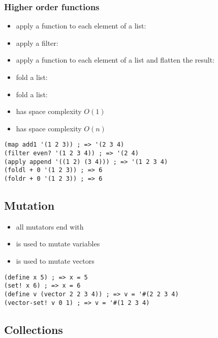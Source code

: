 \documentclass[a4paper,landscape,10pt]{article}
\begin{document}
\begin{multicols*}{2}
  \subsubsection{Higher order functions}

  \begin{itemize}
    \item apply a function to each element of a list: 
    \item apply a filter: 
    \item apply a function to each element of a list and flatten the result: 
    \item fold a list: 
    \item fold a list: 
    \item {} has space complexity \(O(1)\)
    \item {} has space complexity \(O(n)\)
  \end{itemize}

  \begin{lstlisting}[language=Racket]
(map add1 '(1 2 3)) ; => '(2 3 4)
(filter even? '(1 2 3 4)) ; => '(2 4)
(apply append '((1 2) (3 4))) ; => '(1 2 3 4)
(foldl + 0 '(1 2 3)) ; => 6
(foldr + 0 '(1 2 3)) ; => 6
\end{lstlisting}

  \subsection{Mutation}

  \begin{itemize}
    \item all mutators end with \iracket{\!}
    \item {} is used to mutate variables
    \item {} is used to mutate vectors
  \end{itemize}

  \begin{lstlisting}[language=Racket]
(define x 5) ; => x = 5
(set! x 6) ; => x = 6
(define v (vector 2 2 3 4)) ; => v = '#(2 2 3 4)
(vector-set! v 0 1) ; => v = '#(1 2 3 4)
\end{lstlisting}

  \breakcolumn

  \subsection{Collections}


\end{multicols*}
\end{document}
